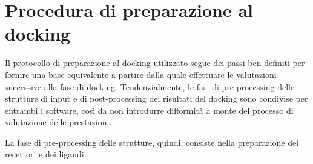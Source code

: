 \section{Procedura di preparazione al docking} \label{preparation}
Il protocollo di preparazione al docking utilizzato segue dei passi ben definiti per fornire una base equivalente a partire dalla quale effettuare le valutazioni successive alla fase di docking. Tendenzialmente, le fasi di pre-processing delle strutture di input e di post-processing dei risultati del docking sono condivise per entrambi i software, così da non introdurre difformità a monte del processo di valutazione delle prestazioni. 

La fase di pre-processing delle strutture, quindi, consiste nella preparazione dei recettori e dei ligandi.

\begin{table}[H]
\centering
{}
\caption[Riepilogo delle procedura di preparazione.]{Riepilogo delle procedura di preparazione. A sinistra la procedura di preparazione dei recettori, a destra la procedura di preparazione dei ligandi. }
\label{preparation_table}
\end{table}

